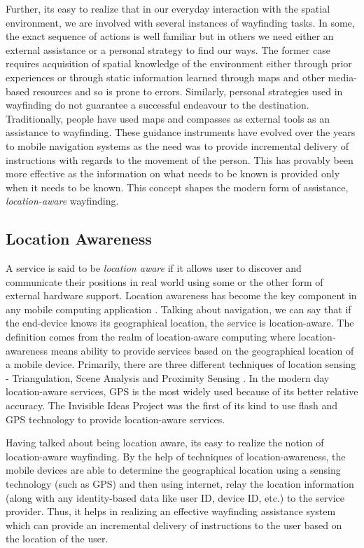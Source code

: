\documentclass{iitkthesis}
\begin{document}
Further, its easy to realize that in our everyday interaction with the spatial environment, we are involved with several instances of wayfinding tasks. In some, the exact sequence of actions is well familiar but in others we need either an external assistance or a personal strategy to find our ways. The former case requires acquisition of spatial knowledge of the environment either through prior experiences or through static information learned through maps and other media-based resources and so is prone to errors. Similarly, personal strategies used in wayfinding do not guarantee a successful endeavour to the destination. Traditionally, people have used maps and compasses as external tools as an assistance to wayfinding. These guidance instruments have evolved over the years to mobile navigation systems as the need was to provide incremental delivery of instructions with regards to the movement of the person. This has provably been more effective as the information on what needs to be known is provided only when it needs to be known. This concept shapes the modern form of assistance, \textit{location-aware} wayfinding. 
\subsection{Location Awareness}
A service is said to be \textit{location aware} if it allows user to discover and communicate their positions in real world using some or the other form of external hardware support. Location awareness has become the key component in any mobile computing application \cite{parctab}. Talking about navigation, we can say that if the end-device knows its geographical location, the service is location-aware. The definition comes from the realm of location-aware computing where location-awareness means ability to provide services based on the geographical location of a mobile device. Primarily, there are three different techniques of location sensing - Triangulation, Scene Analysis and Proximity Sensing \cite{hightower}. In the modern day location-aware services, GPS is the most widely used because of its better relative accuracy. The Invisible Ideas Project \cite{perry} was the first of its kind to use flash and GPS technology to provide location-aware services.

Having talked about being location aware, its easy to realize the notion of location-aware wayfinding. By the help of techniques of location-awareness, the mobile devices are able to determine the geographical location using a sensing technology (such as GPS) and then using internet, relay the location information (along with any identity-based data like user ID, device ID, etc.) to the service provider. Thus, it helps in realizing an effective wayfinding assistance system which can provide an incremental delivery of instructions to the user based on the location of the user. 
\end{document}
